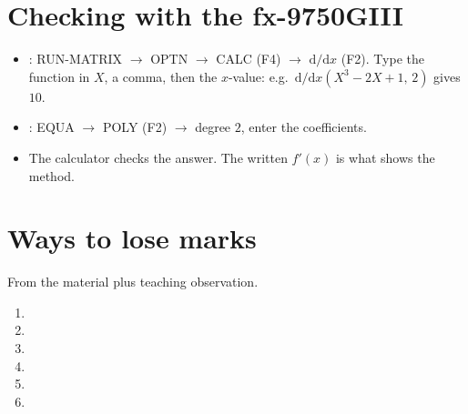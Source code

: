 \documentclass[11pt]{article}
\begin{document}
\section{Checking with the fx-9750GIII}\label{calc}
\begin{itemize}[leftmargin=5mm, itemsep=1pt]
\item {}: \textsf{RUN-MATRIX} $\to$ \textsf{OPTN} $\to$ \textsf{CALC} (F4) $\to$ $\mathrm{d}/\mathrm{d}x$ (F2).
Type the function in $X$, a comma, then the $x$-value: e.g.\ $\mathrm{d}/\mathrm{d}x(X^{3}-2X+1,\,2)$ gives $10$.
\item {}: \textsf{EQUA} $\to$ \textsf{POLY} (F2) $\to$ degree $2$, enter the coefficients.
\item The calculator checks the answer. The written $f'(x)$ is what shows the method.
\end{itemize}

\section{Ways to lose marks}\label{lose}
From the material plus teaching observation.
\begin{enumerate}[label=\textbf{\arabic*.}, leftmargin=7mm, itemsep=2pt]
\item[\textbf{\lmnum{expand}}] 
\item[\textbf{\lmnum{wrongfn}}] 
\item[\textbf{\lmnum{terms}}] 
\item[\textbf{\lmnum{xinm}}] 
\item[\textbf{\lmnum{signs}}] 
\item[\textbf{\lmnum{nocalc}}] 
\end{enumerate}
\end{document}
